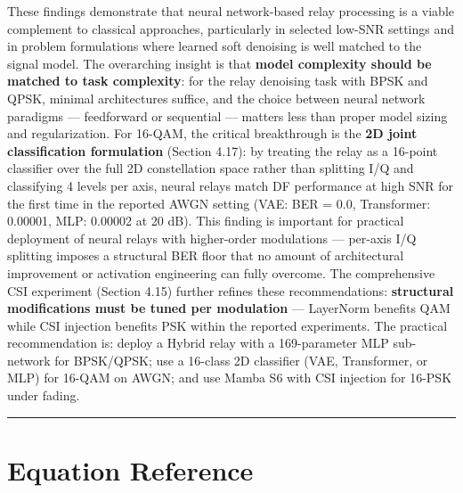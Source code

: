 \documentclass[
  english,
  12pt,
  12pt,
  a4paper,
  oneside]{report}
\begin{document}
These findings demonstrate that neural network-based relay processing is a viable complement to classical approaches, particularly in selected low-SNR settings and in problem formulations where learned soft denoising is well matched to the signal model. The overarching insight is that \textbf{model complexity should be matched to task complexity}: for the relay denoising task with BPSK and QPSK, minimal architectures suffice, and the choice between neural network paradigms --- feedforward or sequential --- matters less than proper model sizing and regularization. For 16-QAM, the critical breakthrough is the \textbf{2D joint classification formulation} (Section 4.17): by treating the relay as a 16-point classifier over the full 2D constellation space rather than splitting I/Q and classifying 4 levels per axis, neural relays match DF performance at high SNR for the first time in the reported AWGN setting (VAE: BER = 0.0, Transformer: 0.00001, MLP: 0.00002 at 20 dB). This finding is important for practical deployment of neural relays with higher-order modulations --- per-axis I/Q splitting imposes a structural BER floor that no amount of architectural improvement or activation engineering can fully overcome. The comprehensive CSI experiment (Section 4.15) further refines these recommendations: \textbf{structural modifications must be tuned per modulation} --- LayerNorm benefits QAM while CSI injection benefits PSK within the reported experiments. The practical recommendation is: deploy a Hybrid relay with a 169-parameter MLP sub-network for BPSK/QPSK; use a 16-class 2D classifier (VAE, Transformer, or MLP) for 16-QAM on AWGN; and use Mamba S6 with CSI injection for 16-PSK under fading.

\begin{center}\rule{0.5\linewidth}{0.5pt}\end{center}

\chapter*{Equation Reference}\label{sec:equation-reference}
\end{document}
